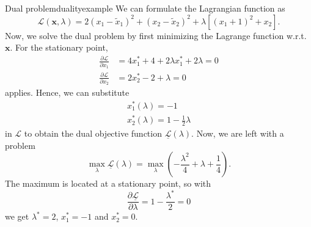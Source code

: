 \begin{example}{Dual problem}{dualityexample}
    We can formulate the Lagrangian function as
    \begin{equation}
        \mathcal{\mathcal{L}}(\mathbf{x}, \lambda) = 2 (x_1-\tilde{x}_1)^2 + (x_2-\tilde{x}_2)^2 + \lambda \left[(x_1+1)^2 + x_2 \right].
    \end{equation}
    Now, we solve the dual problem by first minimizing the Lagrange function w.r.t. $\mathbf{x}$. For the stationary point, 
    \begin{align}
        \frac{\partial \mathcal{L}}{\partial x_1} &= 4 x^*_1 +4 + 2 \lambda x^*_1 + 2 \lambda = 0\\
        \frac{\partial \mathcal{L}}{\partial x_2} &= 2 x^*_2 - 2 + \lambda = 0
    \end{align} 
    applies. Hence, we can substitute 
    \begin{align}
        x^*_1(\lambda) = -1 \\
        x^*_2(\lambda) = 1 - \frac{1}{2} \lambda 
    \end{align}
    in $\mathcal{L}$ to obtain the dual objective function $\underline{\mathcal{L}} (\lambda)$. Now, we are left with a problem 
    \begin{equation}
        \max_{\lambda} \underline{\mathcal{L}} (\lambda) = 
        \max_{\lambda} \left( - \frac{\lambda^2}{4} + \lambda + \frac{1}{4} \right).
    \end{equation}
    The maximum is located at a stationary point, so with 
    \begin{equation}
        \frac{\partial \underline{\mathcal{L}} }{\partial \lambda} = 1 - \frac{\lambda^*}{2}  = 0
    \end{equation}
    we get $\lambda^*=2$, $x_1^*=-1$ and $x_2^*=0$.
\end{example}

